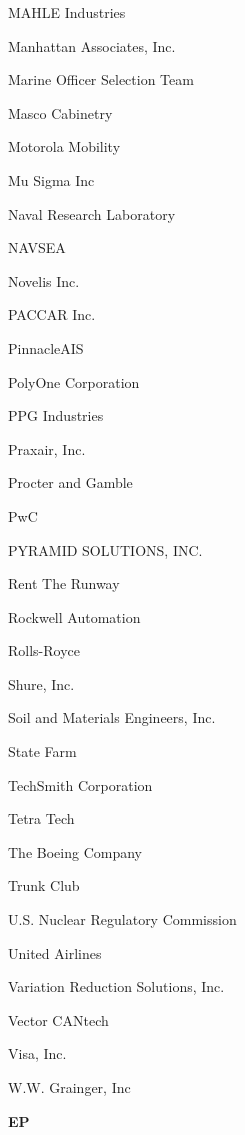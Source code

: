 \documentclass[twoside]{article}
\begin{document}
\begin{center}
\begin{multicols}{5}
\begin{FlushLeft}
\begin{compactitem}
\item MAHLE Industries
\item Manhattan Associates, Inc.
\item Marine Officer Selection Team
\item Masco Cabinetry
\item Motorola Mobility
\item Mu Sigma Inc
\item Naval Research Laboratory
\item NAVSEA
\item Novelis Inc.
\item PACCAR Inc.
\item PinnacleAIS
\item PolyOne Corporation
\item PPG Industries
\item Praxair, Inc.
\item Procter and Gamble
\item PwC
\item PYRAMID SOLUTIONS, INC.
\item Rent The Runway
\item Rockwell Automation
\item Rolls-Royce
\item Shure, Inc.
\item Soil and Materials Engineers, Inc.
\item State Farm
\item TechSmith Corporation
\item Tetra Tech
\item The Boeing Company
\item Trunk Club
\item U.S. Nuclear Regulatory Commission
\item United Airlines
\item Variation Reduction Solutions, Inc.
\item Vector CANtech
\item Visa, Inc.
\item W.W. Grainger, Inc
\end{compactitem}
        \end{FlushLeft}
        \vspace{1em}
        {\fontsize{14}{16}\selectfont \bf EP}\\
        \vspace{-1em}
        ~\hrulefill~
        \vspace{-.9em}
        \begin{FlushLeft}
        \begin{compactitem}

\end{compactitem}
\end{FlushLeft}
\end{multicols}
\end{center}
\end{document}
